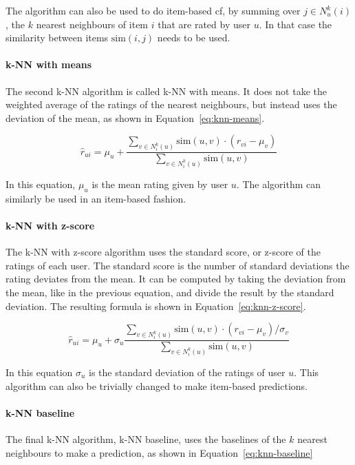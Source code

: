 The algorithm can also be used to do item-based \gls{cf}, by summing over $j \in N_u^k(i)$, the $k$ nearest neighbours of item $i$ that are rated by user $u$.
In that case the similarity between items $\text{sim}(i,j)$ needs to be used.

\paragraph{k-NN with means}
The second k-NN algorithm is called k-NN with means.
It does not take the weighted average of the ratings of the nearest neighbours, but instead uses the deviation of the mean, as shown in Equation~\ref{eq:knn-means}.

\begin{equation}
    \label{eq:knn-means}
    \hat{r}_{ui} = \mu_u + \frac{\sum\limits_{v \in N_i^k(u)} \text{sim}(u, v) \cdot (r_{vi} - \mu_v) }{\sum\limits_{v \in N_i^k(u)} \text{sim}(u, v)}
\end{equation}

In this equation, $\mu_u$ is the mean rating given by user $u$.
The algorithm can similarly be used in an item-based fashion.

\paragraph{k-NN with z-score}
The k-NN with z-score algorithm uses the standard score, or z-score of the ratings of each user.
The standard score is the number of standard deviations the rating deviates from the mean.
It can be computed by taking the deviation from the mean, like in the previous equation, and divide the result by the standard deviation.
The resulting formula is shown in Equation~\ref{eq:knn-z-score}.

\begin{equation}
    \label{eq:knn-z-score}
    \hat{r}_{ui} = \mu_u + \sigma_u \frac{\sum\limits_{v \in N_i^k(u)} \text{sim}(u, v) \cdot (r_{vi} - \mu_v) / \sigma_v }{\sum\limits_{v \in N_i^k(u)} \text{sim}(u, v)}
\end{equation}

In this equation $\sigma_u$ is the standard deviation of the ratings of user $u$.
This algorithm can also be trivially changed to make item-based predictions.

\paragraph{k-NN baseline}
The final k-NN algorithm, k-NN baseline, uses the baselines of the $k$ nearest neighbours to make a prediction, as shown in Equation~\ref{eq:knn-baseline}

